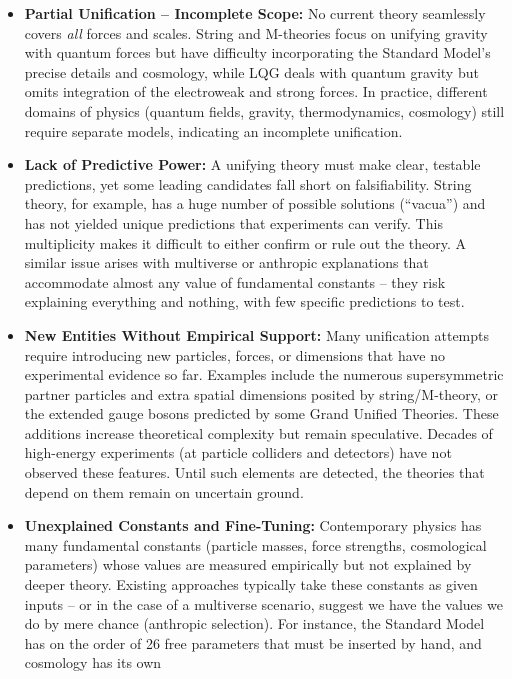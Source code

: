 \documentclass[]{article}
\begin{document}
\begin{itemize}
\item
  \textbf{Partial Unification -- Incomplete Scope:} No current theory
  seamlessly covers \emph{all} forces and scales. String and M-theories
  focus on unifying gravity with quantum forces but have difficulty
  incorporating the Standard Model's precise details and cosmology,
  while LQG deals with quantum gravity but omits integration of the
  electroweak and strong forces. In practice, different domains of
  physics (quantum fields, gravity, thermodynamics, cosmology) still
  require separate models, indicating an incomplete unification.
\item
  \textbf{Lack of Predictive Power:} A unifying theory must make clear,
  testable predictions, yet some leading candidates fall short on
  falsifiability. String theory, for example, has a huge number of
  possible solutions (``vacua'') and has not yielded unique predictions
  that experiments can verify. This multiplicity makes it difficult to
  either confirm or rule out the theory. A similar issue arises with
  multiverse or anthropic explanations that accommodate almost any value
  of fundamental constants -- they risk explaining everything and
  nothing, with few specific predictions to test.
\item
  \textbf{New Entities Without Empirical Support:} Many unification
  attempts require introducing new particles, forces, or dimensions that
  have no experimental evidence so far. Examples include the numerous
  supersymmetric partner particles and extra spatial dimensions posited
  by string/M-theory, or the extended gauge bosons predicted by some
  Grand Unified Theories. These additions increase theoretical
  complexity but remain speculative. Decades of high-energy experiments
  (at particle colliders and detectors) have not observed these
  features. Until such elements are detected, the theories that depend
  on them remain on uncertain ground.
\item
  \textbf{Unexplained Constants and Fine-Tuning:} Contemporary physics
  has many fundamental constants (particle masses, force strengths,
  cosmological parameters) whose values are measured empirically but not
  explained by deeper theory. Existing approaches typically take these
  constants as given inputs -- or in the case of a multiverse scenario,
  suggest we have the values we do by mere chance (anthropic selection).
  For instance, the Standard Model has on the order of 26 free
  parameters that must be inserted by hand, and cosmology has its own

\end{itemize}
\end{document}

